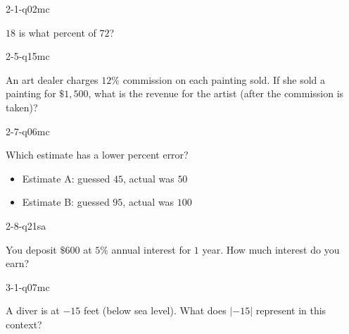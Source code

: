 \documentclass[12pt, fleqn, openany]{studyGuide}
\begin{document}
\begin{practiceQuestion}{2-1-q02}{mc}
\begin{questionText}
$18$ is what percent of $72$?
\end{questionText}
\end{practiceQuestion}

\begin{practiceQuestion}{2-5-q15}{mc}
\begin{questionText}
An art dealer charges $12\%$ commission on each painting sold. If she sold a painting for $\$1{,}500$, what is the revenue for the artist (after the commission is taken)?
\end{questionText}
\end{practiceQuestion}

\begin{practiceQuestion}{2-7-q06}{mc}
\begin{questionText}
Which estimate has a lower percent error?
\begin{itemize}
    \item Estimate A: guessed $45$, actual was $50$
    \item Estimate B: guessed $95$, actual was $100$
\end{itemize}
\end{questionText}
\end{practiceQuestion}

\begin{practiceQuestion}{2-8-q21}{sa}
\begin{questionText}
You deposit $\$600$ at $5\%$ annual interest for $1$ year. How much interest do you earn?
\end{questionText}
\end{practiceQuestion}

\begin{practiceQuestion}{3-1-q07}{mc}
\begin{questionText}
A diver is at $-15$ feet (below sea level). What does $|-15|$ represent in this context?
\end{questionText}
\end{practiceQuestion}
\end{document}
